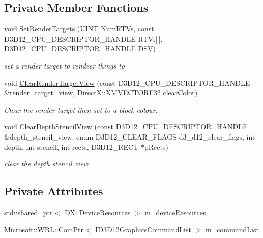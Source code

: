 \subsection*{Private Member Functions}
\begin{DoxyCompactItemize}
\item 
void \mbox{\hyperlink{class_command_list_manager_a44477586c6a56dbf51c7a73806ec9f71}{Set\+Render\+Targets}} (U\+I\+NT Num\+R\+T\+Vs, const D3\+D12\+\_\+\+C\+P\+U\+\_\+\+D\+E\+S\+C\+R\+I\+P\+T\+O\+R\+\_\+\+H\+A\+N\+D\+LE R\+T\+Vs\mbox{[}$\,$\mbox{]}, D3\+D12\+\_\+\+C\+P\+U\+\_\+\+D\+E\+S\+C\+R\+I\+P\+T\+O\+R\+\_\+\+H\+A\+N\+D\+LE D\+SV)
\begin{DoxyCompactList}\small\item\em set a render target to rendeer things to \end{DoxyCompactList}\item 
void \mbox{\hyperlink{class_command_list_manager_a3c7ee088fcfb3ce4cb8aee0ebfdc63e0}{Clear\+Render\+Target\+View}} (const D3\+D12\+\_\+\+C\+P\+U\+\_\+\+D\+E\+S\+C\+R\+I\+P\+T\+O\+R\+\_\+\+H\+A\+N\+D\+LE \&render\+\_\+target\+\_\+view, Direct\+X\+::\+X\+M\+V\+E\+C\+T\+O\+R\+F32 clear\+Color)
\begin{DoxyCompactList}\small\item\em Clear the render target then set to a block colour. \end{DoxyCompactList}\item 
void \mbox{\hyperlink{class_command_list_manager_a2ed1b25ab6762e63d52c47dfa52d3a00}{Clear\+Depth\+Stencil\+View}} (const D3\+D12\+\_\+\+C\+P\+U\+\_\+\+D\+E\+S\+C\+R\+I\+P\+T\+O\+R\+\_\+\+H\+A\+N\+D\+LE \&depth\+\_\+stencil\+\_\+view, enum D3\+D12\+\_\+\+C\+L\+E\+A\+R\+\_\+\+F\+L\+A\+GS d3\+\_\+d12\+\_\+clear\+\_\+flags, int depth, int stencil, int rects, D3\+D12\+\_\+\+R\+E\+CT $\ast$p\+Rects)
\begin{DoxyCompactList}\small\item\em clear the depth stencil view \end{DoxyCompactList}\end{DoxyCompactItemize}
\subsection*{Private Attributes}
\begin{DoxyCompactItemize}
\item 
std\+::shared\+\_\+ptr$<$ \mbox{\hyperlink{class_d_x_1_1_device_resources}{D\+X\+::\+Device\+Resources}} $>$ \mbox{\hyperlink{class_command_list_manager_a1c48b5dc7b34886ce5057ac194a2385e}{m\+\_\+device\+Resources}}
\item 
Microsoft\+::\+W\+R\+L\+::\+Com\+Ptr$<$ I\+D3\+D12\+Graphics\+Command\+List $>$ \mbox{\hyperlink{class_command_list_manager_a1366f0acddca408167ffcab59be71ddb}{m\+\_\+command\+List}}
\end{DoxyCompactItemize}


